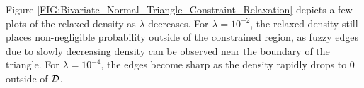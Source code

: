 \documentclass[10pt,fleqn]{article}
\DeclareMathOperator{\1}{\mathbbm{1}} \DeclareMathOperator{\bigO}{\mc O}
\begin{document}
Figure \ref{FIG:Bivariate_Normal_Triangle_Constraint_Relaxation} depicts
a few plots of the relaxed density as $\lambda$ decreases.  For $\lambda=
10^{-2}$, the relaxed density still places non-negligible probability outside
of the constrained region, as fuzzy edges due to slowly decreasing density
can be observed near the boundary of the triangle. For $\lambda=10^{-4}$,
the edges become sharp as the density rapidly drops to $0$ outside of $\mathcal{D}$. 
\end{document}
